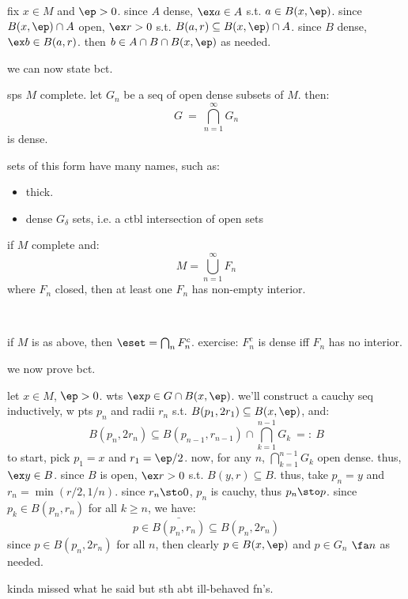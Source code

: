 \begin{pf}[source=Primary Source Material]
	fix $x\in M$ and $\ep>0$.
	since $A$ dense, $\ex a\in A$ s.t. $a\in B(x,\ep)$.
	since $B(x,\ep)\cap A$ open, $\ex r>0$ s.t. $B(a,r)\subseteq B(x,\ep)\cap A$.
	since $B$ dense, $\ex b\in B(a,r)$.
	then $b\in A\cap B\cap B(x,\ep)$ as needed.
\end{pf}
we can now state bct.

\begin{thm}[title=Baire Category Theorem]
	sps $M$ complete. let $G_{n}$ be a seq of open dense subsets of $M$. then:
	\begin{equation*}
		G \ = \ \bigcap_{n=1}^{\infty}G_{n}
	\end{equation*}
	is dense.
\end{thm}
sets of this form have many names, such as:
\begin{itemize}
	\item thick.
	\item dense $G_{\delta}$ sets, i.e. a ctbl intersection of open sets
\end{itemize}

\begin{crll}
	if $M$ complete and:
	\begin{equation*}
		M=\bigcup_{n=1}^{\infty}F_{n}
	\end{equation*}
	where $F_{n}$ closed, then at least one $F_{n}$ has non-empty interior.
\end{crll} \

\begin{pf}[source=Primary Source Material]
	if $M$ is as above, then $\eset=\bigcap_{n}F_{n}^{c}$.
	exercise: $F_{n}^{c}$ is dense iff $F_{n}$ has no interior.
\end{pf}
we now prove bct.

\newpage
\begin{pf}[source=Primary Source Material]
	let $x\in M$, $\ep>0$. wts $\ex p\in G\cap B(x,\ep)$.
	we'll construct a cauchy seq inductively, w pts $p_{n}$ and radii $r_{n}$ s.t.
	$B(p_{1},2r_{1})\subseteq B(x,\ep)$, and:
	\begin{equation*}
		B(p_{n},2r_{n})\subseteq B(p_{n-1},r_{n-1})\cap \bigcap_{k=1}^{n-1}G_{k}
		\ =: \ B
	\end{equation*}
	to start, pick $p_{1}=x$ and $r_{1}=\ep/2$.
	now, for any $n$, $\bigcap_{k=1}^{n-1}G_{k}$ open dense. thus, $\ex y \in B$.
	since $B$ is open, $\ex r>0$ s.t. $B(y,r)\subseteq B$.
	thus, take $p_{n}=y$ and $r_{n}=\min(r/2,1/n)$.
	since $r_{n}\sto0$, $p_{n}$ is cauchy, thus $p_{n}\sto p$.
	since $p_{k}\in B(p_{n},r_{n})$ for all $k\geq n$, we have:
	\begin{equation*}
		p\in\bar{B(p_{n},r_{n})}\subseteq B(p_{n},2r_{n})
	\end{equation*}
	since $p\in B(p_{n},2r_{n})$ for all $n$, then clearly $p\in B(x,\ep)$ and $p\in G_{n}$ $\fa n$
	as needed.
\end{pf}
kinda missed what he said but sth abt ill-behaved fn's.

